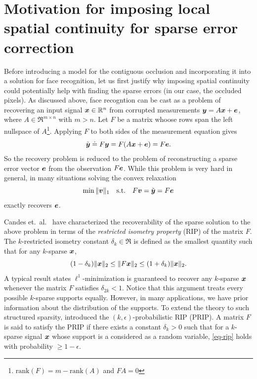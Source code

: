 \section{Motivation for imposing local spatial continuity for sparse error correction}
Before introducing a model for the contiguous occlusion and incorporating it into a solution for face recognition, let us first justify why imposing spatial continuity could potentially help with finding the sparse errors (in our case, the occluded pixels). As discussed above, face recogntion can be cast as a problem of recovering an input signal ${\boldsymbol{x}}\in \mathbb R^n$ from corrupted measurements ${\boldsymbol{y}} = A{\boldsymbol{x}}+\boldsymbol{e}$, where $A\in
\Re^{m\times n}$ with $m>n$. Let $F$ be a matrix whoose rows span the left nullspace of
$A$\footnote{$\mathrm{rank}(F) = m - \mathrm{rank}(A)$ and $FA=0$}. Applying $F$ to both sides of the measurement equation gives \vspace{0mm}
\begin{displaymath}
\tilde{\y} \doteq F \y = F(A \x+ \e) = F\e. \vspace{0mm}
\end{displaymath}
So the recovery problem is reduced to the problem of reconstructing
a sparse error vector $\boldsymbol{e}$ from the observation $F \boldsymbol{e}$. While this problem is very hard in general, in many situations solving the convex relaxation \vspace{0mm}
\begin{equation*}
\min \| \mathbf{v} \|_1 \quad \textup{s.t.} \quad F \mathbf{v} = \tilde{\y} = F \e \vspace{0mm}
\end{equation*}
exactly recovers $\boldsymbol{e}$.

Candes et.\ al.\ \cite{CandesE2005-IT} have characterized the recoverability of the sparse solution to the above problem in terms of the {\em restricted isometry property} (RIP) of the matrix $F$.
The $k$-restricted isometry constant $\delta_k \in \Re$ is defined as the smallest
quantity such that for any $k$-sparse ${\boldsymbol{x}}$,
\begin{equation}
(1-\delta_k)\|{\boldsymbol{x}}\|_2 \leq \|F{\boldsymbol{x}}\|_2 \leq (1+\delta_k)\|{\boldsymbol{x}}\|_2.
\label{eq-rip}
\end{equation}
A typical result states $\ell^1$-minimization is guaranteed to recover any $k$-sparse ${\boldsymbol{x}}$ whenever the matrix
$F$ satisfies $\delta_{2k}<1$. Notice that this argument treats every
possible $k$-sparse supports equally. However, in many
applications, we have prior information about the
distribution of the supports. To extend the theory to such
structured sparsity, \cite{Cevher2008-NIPS} introduced the
$(k,\epsilon)$-probabilistic RIP (PRIP). A matrix $F$ is said to
satisfy the PRIP if there exists a constant $\delta_k>0$ such that
for a $k$-sparse signal ${\boldsymbol{x}}$ whose support is a considered as a random variable, \eqref{eq-rip} holds with probability $\ge 1-\epsilon$.

